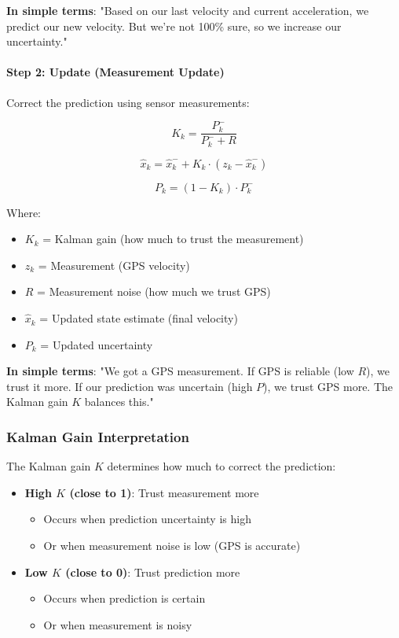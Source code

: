 \documentclass[11pt,a4paper]{article}
\begin{document}
\textbf{In simple terms}: "Based on our last velocity and current acceleration, we predict our new velocity. But we're not 100\% sure, so we increase our uncertainty."

\paragraph{Step 2: Update (Measurement Update)}
Correct the prediction using sensor measurements:

\begin{equation}
K_k = \frac{P_k^-}{P_k^- + R}
\end{equation}

\begin{equation}
\hat{x}_k = \hat{x}_k^- + K_k \cdot (z_k - \hat{x}_k^-)
\end{equation}

\begin{equation}
P_k = (1 - K_k) \cdot P_k^-
\end{equation}

Where:
\begin{itemize}
    \item $K_k$ = Kalman gain (how much to trust the measurement)
    \item $z_k$ = Measurement (GPS velocity)
    \item $R$ = Measurement noise (how much we trust GPS)
    \item $\hat{x}_k$ = Updated state estimate (final velocity)
    \item $P_k$ = Updated uncertainty
\end{itemize}

\textbf{In simple terms}: "We got a GPS measurement. If GPS is reliable (low $R$), we trust it more. If our prediction was uncertain (high $P$), we trust GPS more. The Kalman gain $K$ balances this."

\subsubsection{Kalman Gain Interpretation}
The Kalman gain $K$ determines how much to correct the prediction:

\begin{itemize}
    \item \textbf{High $K$ (close to 1)}: Trust measurement more
    \begin{itemize}
        \item Occurs when prediction uncertainty is high
        \item Or when measurement noise is low (GPS is accurate)
    \end{itemize}
    \item \textbf{Low $K$ (close to 0)}: Trust prediction more
    \begin{itemize}
        \item Occurs when prediction is certain
        \item Or when measurement is noisy
    \end{itemize}
\end{itemize}
\end{document}
